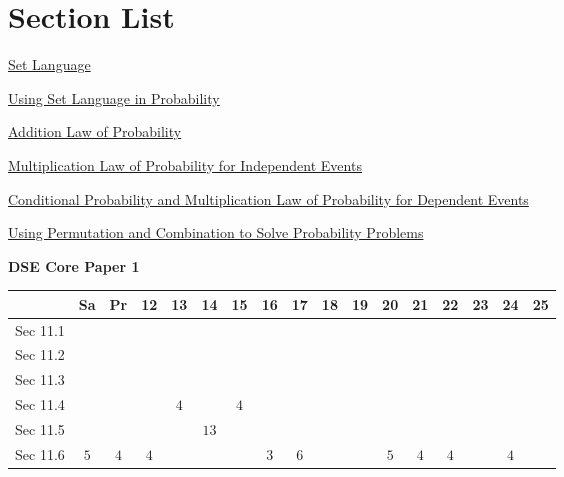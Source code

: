 \documentclass[12pt, a4paper]{article}
\begin{document}
\section*{Section List}
\begin{enumx}[label=Sec 11.\arabic*\ ]
\item \hyperref[section:5-11-1]{Set Language \NF}
\item \hyperref[section:5-11-2]{Using Set Language in Probability \NF}
\item \hyperref[section:5-11-3]{Addition Law of Probability \NF}
\item \hyperref[section:5-11-4]{Multiplication Law of Probability for Independent Events \NF}
\item \hyperref[section:5-11-5]{Conditional Probability and Multiplication Law of Probability for Dependent Events \NF}
\item \hyperref[section:5-11-6]{Using Permutation and Combination to Solve Probability Problems \NF}
\end{enumx}
\begin{absolutelynopagebreak}
\begin{center}
\textbf{DSE Core Paper 1}
\end{center}
\begin{center}
\begin{tabular}{|l|c|c|c|c|c|c|c|c|c|c|c|c|c|c|c|c|}
\hline
        & Sa & Pr & 12 & 13 & 14 & 15 & 16 & 17 & 18 & 19 & 20 & 21 & 22 & 23 & 24 & 25 \\\hline\hline
Sec 11.1 &  &  &  &  &  &  &  &  &  &  &  &  &  &  &  &  \\\hline
Sec 11.2 &  &  &  &  &  &  &  &  &  &  &  &  &  &  &  &  \\\hline
Sec 11.3 &  &  &  &  &  &  &  &  &  &  &  &  &  &  &  &  \\\hline
Sec 11.4 &  &  &  &  $4$ &  &  $4$ &  &  &  &  &  &  &  &  &  &  \\\hline
Sec 11.5 &  &  &  &  &  $13$ &  &  &  &  &  &  &  &  &  &  &  \\\hline
Sec 11.6 &  $5$ &  $4$ &  $4$ &  &  &  &  $3$ &  $6$ &  &  &  $5$ &  $4$ &  $4$ &  &  $4$ &  \\\hline
\end{tabular}
\end{center}
\end{absolutelynopagebreak}
\end{document}

